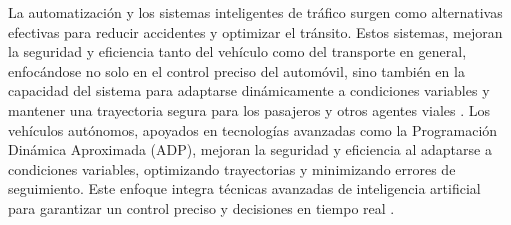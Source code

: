 \documentclass[conference]{IEEEtran}
\begin{document}
La automatización y los sistemas inteligentes de tráfico surgen como alternativas efectivas para reducir accidentes y optimizar el tránsito. Estos sistemas, mejoran la seguridad y eficiencia tanto del vehículo como del transporte en general, enfocándose no solo en el control preciso del automóvil, sino también en la capacidad del sistema para adaptarse dinámicamente a condiciones variables y mantener una trayectoria segura para los pasajeros y otros agentes viales \cite{arshad2020clothoid}. Los vehículos autónomos, apoyados en tecnologías avanzadas como la Programación Dinámica Aproximada (ADP), mejoran la seguridad y eficiencia al adaptarse a condiciones variables, optimizando trayectorias y minimizando errores de seguimiento. Este enfoque integra técnicas avanzadas de inteligencia artificial para garantizar un control preciso y decisiones en tiempo real  \cite{ADP_A}.
\end{document}
